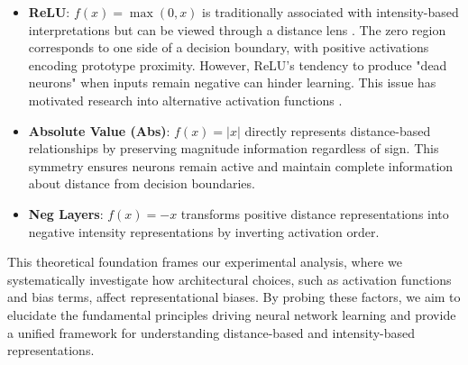 \begin{itemize}
    \item \textbf{ReLU}: $f(x) = \max(0, x)$ is traditionally associated with intensity-based interpretations but can be viewed through a distance lens \cite{nair2010relu, glorot2011deep}. The zero region corresponds to one side of a decision boundary, with positive activations encoding prototype proximity. However, ReLU's tendency to produce "dead neurons" when inputs remain negative can hinder learning. This issue has motivated research into alternative activation functions \cite{he2015delving, ramachandran2017searching, misra2019mish}.
    
    \item \textbf{Absolute Value (Abs)}: $f(x) = |x|$ directly represents distance-based relationships by preserving magnitude information regardless of sign. This symmetry ensures neurons remain active and maintain complete information about distance from decision boundaries.
    
    \item \textbf{Neg Layers}: $f(x) = -x$ transforms positive distance representations into negative intensity representations by inverting activation order.
\end{itemize}

This theoretical foundation frames our experimental analysis, where we systematically investigate how architectural choices, such as activation functions and bias terms, affect representational biases. By probing these factors, we aim to elucidate the fundamental principles driving neural network learning and provide a unified framework for understanding distance-based and intensity-based representations.
